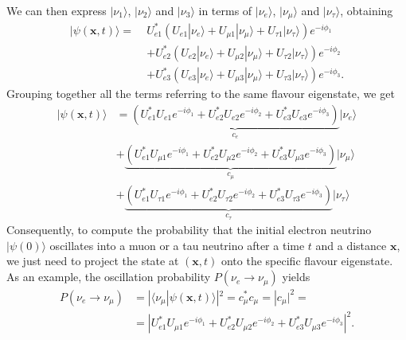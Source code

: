 We can then express $| \nu_1 \rangle$, $| \nu_2 \rangle$ and $| \nu_3 \rangle$ in terms of $| \nu_e \rangle$, $| \nu_\mu \rangle$ and 
$| \nu_\tau \rangle$, obtaining
\begin{equation*}
    \begin{aligned}
        | \psi(\mathbf{x}, t) \rangle = \;& U_{e1}^* (U_{e1} | \nu_e \rangle + U_{\mu 1} | \nu_\mu \rangle + U_{\tau 1} | \nu_\tau \rangle) e^{-i\phi_1} \\
        &+ U_{e2}^* (U_{e2} | \nu_e \rangle + U_{\mu 2} | \nu_\mu \rangle + U_{\tau 2} | \nu_\tau \rangle) e^{-i\phi_2} \\
        &+ U_{e3}^* (U_{e3} | \nu_e \rangle + U_{\mu 3} | \nu_\mu \rangle + U_{\tau 3} | \nu_\tau \rangle) e^{-i\phi_3}.
    \end{aligned}
\end{equation*}
Grouping together all the terms referring to the same flavour eigenstate, we get
\begin{equation}
    \label{eq:evolved-state}
    \begin{aligned}
        | \psi(\mathbf{x}, t) \rangle &= \underbrace{(U_{e1}^* U_{e1} e^{-i\phi_1} + U_{e2}^* U_{e2} e^{-i\phi_2} + U_{e3}^* U_{e3} e^{-i\phi_3})}_{c_e} | \nu_e \rangle \\
        &+ \underbrace{(U_{e1}^* U_{\mu 1} e^{-i\phi_1} + U_{e2}^* U_{\mu 2} e^{-i\phi_2} + U_{e3}^* U_{\mu 3} e^{-i\phi_3})}_{c_\mu} | \nu_\mu \rangle \\
        &+ \underbrace{(U_{e1}^* U_{\tau 1} e^{-i\phi_1} + U_{e2}^* U_{\tau 2} e^{-i\phi_2} + U_{e3}^* U_{\tau 3} e^{-i\phi_3})}_{c_\tau} | \nu_\tau \rangle
    \end{aligned}
\end{equation}
Consequently, to compute the probability that the initial electron neutrino $| \psi(0) \rangle$ oscillates into a muon or a tau neutrino
after a time $t$ and a distance $\mathbf{x}$, we just need to project the state at $(\mathbf{x}, t)$ onto the specific flavour eigenstate. 
As an example, the oscillation probability $P(\nu_{e} \rightarrow \nu_\mu)$ yields
\begin{equation}
    \label{eq:oscillation-prob}
    \begin{aligned}
        P(\nu_{e} \rightarrow \nu_\mu) &= | \langle \nu_\mu | \psi(\mathbf{x}, t) \rangle|^2 = c_\mu^* c_\mu = |c_\mu|^2 = \\
                    &= \left|U_{e1}^* U_{\mu 1} e^{-i\phi_1} + U_{e2}^* U_{\mu 2} e^{-i\phi_2} + U_{e3}^* U_{\mu 3} e^{-i\phi_3}\right|^2.
    \end{aligned}
\end{equation}
